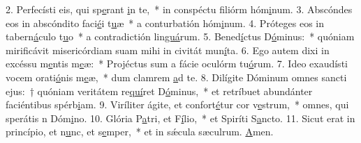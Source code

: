 2. Perfecísti eis, qui sp\uline{e}rant \uline{i}n te,~* in conspéctu filiórm hóm\uline{i}num.
3. Abscóndes eos in abscóndito faci\uline{é}i t\uline{u}æ~* a conturbatión hóm\uline{i}num.
4. Próteges eos in tabern\uline{á}culo t\uline{u}o~* a contradictión lin\uline{guá}rum.
5. Bened\uline{í}ctus D\uline{ó}minus:~* quóniam mirificávit misericórdiam suam mihi in civitát mun\uline{í}ta.
6. Ego autem dixi in excéssu m\uline{e}ntis m\uline{e}æ:~* Projéctus sum a fácie oculórm tu\uline{ó}rum.
7. Ideo exaudísti vocem orati\uline{ó}nis m\uline{e}æ,~* dum clamrem \uline{a}d te.
8. Dilígite Dóminum omnes sancti ejus:~† quóniam veritátem re\uline{quí}ret D\uline{ó}minus,~* et retríbuet abundánter faciéntibus spérb\uline{i}am.
9. Viríliter ágite, et confort\uline{é}tur cor v\uline{e}strum,~* omnes, qui sperátis n Dóm\uline{i}no.
10. Glória P\uline{a}tri, et F\uline{í}lio,~* et Spiríti S\uline{a}ncto.
11. Sicut erat in princípio, et n\uline{u}nc, et s\uline{e}mper,~* et in sǽcula sæculrum. \uline{A}men.
